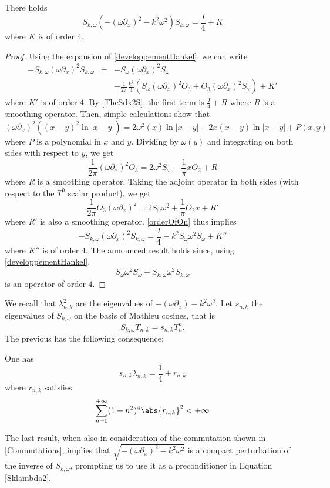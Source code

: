 \documentclass[a4paper]{article}
\begin{document}
	\begin{The} There holds
		\label{TheHelmholtz}
		\[S_{k,\omega} \left( -(\omega \partial_x)^2 - k^2\omega^2\right) S_{k,\omega} = \frac{I}{4} + K\]
		where $K$ is of order $4$. 
		\begin{proof}
			Using the expansion of \autoref{developpementHankel}, we can write 
			\begin{eqnarray*}
				-S_{k,\omega}(\omega \partial_x)^2 S_{k,\omega} &=& -S_\omega (\omega \partial_x)^2 S_\omega \\
				&& - \frac{1}{2\pi}\frac{k^2}{4}\left(S_\omega (\omega \partial_x)^2 O_3 + O_3 (\omega \partial_x)^2 S_\omega\right) + K'
			\end{eqnarray*}
			where $K'$ is of order $4$. By \autoref{TheSdx2S}, the first term is $\frac{I}{4} + R$ where $R$ is a smoothing operator. Then, simple calculations show that
			\[(\omega \partial_x)^2 \left((x - y)^2\ln|x-y|\right) = 2 \omega^2(x)\ln|x-y| -2x(x-y) \ln|x-y| + P(x,y)\]
			where $P$ is a polynomial in $x$ and $y$. Dividing by $\omega(y)$ and integrating on both sides with respect to $y$, we get 
			\[\frac{1}{2\pi}(\omega \partial_x)^2 O_3 = 2 \omega^2 S_\omega - \frac{1}{\pi}xO_2 + R \]
			where $R$ is a smoothing operator. Taking the adjoint operator in both sides (with respect to the $T^0$ scalar product), we get
			\[\frac{1}{2\pi}O_3(\omega \partial_x)^2 = 2 S_\omega\omega^2 + \frac{1}{\pi}O_2x + R'\]
			where $R'$ is also a smoothing operator. \autoref{orderOfOn} thus implies
			\[-S_{k,\omega}(\omega \partial_x)^2 S_{k,\omega} = \frac{I}{4} - k^2S_\omega \omega^2 S_\omega + K''\]
			where $K''$ is of order $4$.
			The announced result holds since, using \autoref{developpementHankel}, 
			\[S_\omega \omega^2 S_\omega - S_{k,\omega} \omega^2 S_{k,\omega}\]
			is an operator of order $4$.
		\end{proof}
	\end{The}
	We recall that $\lambda_{n,k}^2$ are the eigenvalues of $-(\omega \partial_x) - k^2\omega^2$. Let $s_{n,k}$ the eigenvalues of $S_{k,\omega}$ on the basis of Mathieu cosines, that is
	\[S_{k,\omega}T_{n,k} = s_{n,k}T_n^k.\]
	The previous has the following consequence:
	\begin{Cor}
		One has
		\[s_{n,k} \lambda_{n,k} = \frac{1}{4} + r_{n,k}\]
		where $r_{n,k}$ satisfies 
		\[\sum_{n = 0}^{+ \infty}(1 + n^2)^4 \abs{r_{n,k}}^2  < + \infty\]
	\end{Cor}
	
	The last result, when also in consideration of the commutation shown in \autoref{Commutations}, implies that $\sqrt{ -(\omega \partial_x)^2 - k^2\omega^2}$ is a compact perturbation of the inverse of $S_{k,\omega}$, prompting us to use it as a preconditioner in Equation \eqref{Sklambda2}.
	
\end{document}
